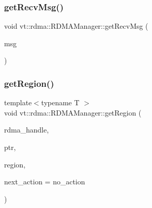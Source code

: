\mbox{\label{structvt_1_1rdma_1_1_r_d_m_a_manager_a1c11e7b5616c22d03fd3884f99d3e7ff}} 
\subsubsection{\texorpdfstring{get\+Recv\+Msg()}{getRecvMsg()}}
{\footnotesize\ttfamily void vt\+::rdma\+::\+R\+D\+M\+A\+Manager\+::get\+Recv\+Msg (\begin{DoxyParamCaption}\item[{\hyperlink{namespacevt_1_1rdma_a72a94b92eba75ec9fec43b2a9a4ad878}{Get\+Back\+Message} $\ast$}]{msg }\end{DoxyParamCaption})\hspace{0.3cm}{\ttfamily [static]}}

\mbox{\label{structvt_1_1rdma_1_1_r_d_m_a_manager_a06506f3abad91d02456d88f4b1e4db1b}} 
\subsubsection{\texorpdfstring{get\+Region()}{getRegion()}}
{\footnotesize\ttfamily template$<$typename T $>$ \\
void vt\+::rdma\+::\+R\+D\+M\+A\+Manager\+::get\+Region (\begin{DoxyParamCaption}\item[{\hyperlink{namespacevt_a10442579ec4e7ebef223818e64bcf908}{R\+D\+M\+A\+\_\+\+Handle\+Type} const \&}]{rdma\+\_\+handle,  }\item[{T}]{ptr,  }\item[{\hyperlink{structvt_1_1rdma_1_1_r_d_m_a_manager_aafc574f533ebf5b34c1389ef504448bf}{R\+D\+M\+A\+\_\+\+Region\+Type} const \&}]{region,  }\item[{\hyperlink{namespacevt_ae0a5a7b18cc99d7b732cb4d44f46b0f3}{Action\+Type}}]{next\+\_\+action = {\ttfamily no\+\_\+action} }\end{DoxyParamCaption})\hspace{0.3cm}{\ttfamily [inline]}}



